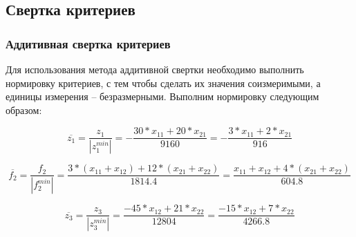 \subsection{Свертка критериев}
\subsubsection{Аддитивная свертка критериев}
Для использования метода аддитивной свертки необходимо выполнить нормировку критериев, с тем чтобы сделать их значения соизмеримыми, а единицы измерения – безразмерными. Выполним нормировку следующим образом:



\begin{equation}
\overline{z_1} = \frac{z_1}{|z_1^{min}|} =-\frac{30*x_{11}+20*x_{21}}{9160} = -\frac{3*x_{11}+2*x_{21}}{916} 
\end{equation}

\begin{equation}
\overline{f_2} = \frac{f_2}{|f_2^{min}|} = \frac{3*(x_{11}+x_{12})+12*(x_{21}+x_{22})}{1814.4}  = \frac{x_{11}+x_{12}+4*(x_{21}+x_{22})}{604.8}  
\end{equation}

\begin{equation}
\overline{z_3} = \frac{z_3}{|z_3^{min}|} = \frac{-45*x_{12}+21*x_{22}}{12804} =   \frac{-15*x_{12}+7*x_{22}}{4266.8}
\end{equation}

